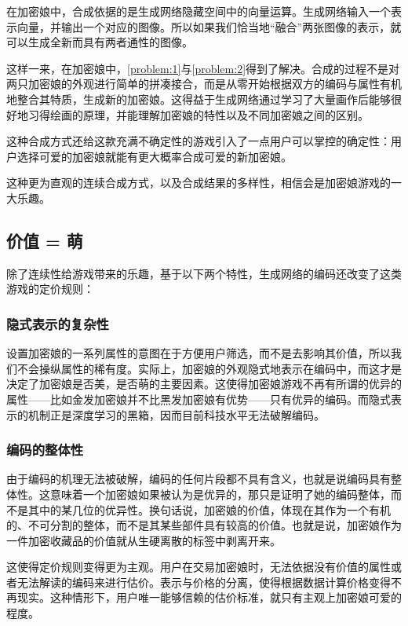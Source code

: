 \documentclass[a4paper]{article}
\begin{document}
在加密娘中，合成依据的是生成网络隐藏空间中的向量运算\cite{radford2015unsupervised}。生成网络输入一个表示向量，并输出一个对应的图像。所以如果我们恰当地“融合”两张图像的表示，就可以生成全新而具有两者通性的图像。

这样一来，在加密娘中，\ref{problem:1}与\ref{problem:2}得到了解决。合成的过程不是对两只加密娘的外观进行简单的拼凑接合，而是从零开始根据双方的编码与属性有机地整合其特质，生成新的加密娘。这得益于生成网络通过学习了大量画作后能够很好地习得绘画的原理，并能理解加密娘的特性以及不同加密娘之间的区别。

这种合成方式还给这款充满不确定性的游戏引入了一点用户可以掌控的确定性：用户选择可爱的加密娘就能有更大概率合成可爱的新加密娘。

这种更为直观的连续合成方式，以及合成结果的多样性，相信会是加密娘游戏的一大乐趣。

\subsection{价值 = 萌}

除了连续性给游戏带来的乐趣，基于以下两个特性，生成网络的编码还改变了这类游戏的定价规则：

\subsubsection{隐式表示的复杂性}

设置加密娘的一系列属性的意图在于方便用户筛选，而不是去影响其价值，所以我们不会操纵属性的稀有度。实际上，加密娘的外观隐式地表示在编码中，而这才是决定了加密娘是否美，是否萌的主要因素。这使得加密娘游戏不再有所谓的优异的属性——比如金发加密娘并不比黑发加密娘有优势——只有优异的编码。而隐式表示的机制正是深度学习的黑箱，因而目前科技水平无法破解编码。

\subsubsection{编码的整体性}

由于编码的机理无法被破解，编码的任何片段都不具有含义，也就是说编码具有整体性。这意味着一个加密娘如果被认为是优异的，那只是证明了她的编码整体，而不是其中的某几位的优异性。换句话说，加密娘的价值，体现在其作为一个有机的、不可分割的整体，而不是其某些部件具有较高的价值。也就是说，加密娘作为一件加密收藏品的价值就从生硬离散的标签中剥离开来。

这使得定价规则变得更为主观。用户在交易加密娘时，无法依据没有价值的属性或者无法解读的编码来进行估价。表示与价格的分离，使得根据数据计算价格变得不再现实。这种情形下，用户唯一能够信赖的估价标准，就只有主观上加密娘可爱的程度。
\end{document}
